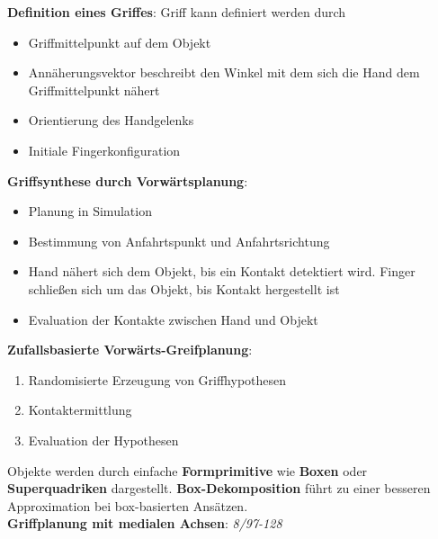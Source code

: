 \bigskip
\textbf{Definition eines Griffes}: Griff kann definiert werden durch
\begin{itemize}
	\item Griffmittelpunkt auf dem Objekt
	\item Annäherungsvektor beschreibt den Winkel mit dem sich die Hand dem Griffmittelpunkt nähert 
	\item Orientierung des Handgelenks
	\item Initiale Fingerkonfiguration
\end{itemize}
\bigskip
\textbf{Griffsynthese durch Vorwärtsplanung}:
\begin{itemize}
	\item Planung in Simulation
	\item Bestimmung von Anfahrtspunkt und Anfahrtsrichtung
	\item Hand nähert sich dem Objekt, bis ein Kontakt detektiert wird. Finger schließen sich um das Objekt, bis Kontakt hergestellt ist
	\item Evaluation der Kontakte zwischen Hand und Objekt
\end{itemize}
\bigskip
\textbf{Zufallsbasierte Vorwärts-Greifplanung}:
\begin{enumerate}
	\item Randomisierte Erzeugung von Griffhypothesen
	\item Kontaktermittlung
	\item Evaluation der Hypothesen
\end{enumerate}

Objekte werden durch einfache \textbf{Formprimitive} wie \textbf{Boxen} oder \textbf{Superquadriken} dargestellt. \textbf{Box-Dekomposition} führt zu einer besseren Approximation bei box-basierten Ansätzen.\\

\textbf{Griffplanung mit medialen Achsen}: \textit{8/97-128}
\pagebreak